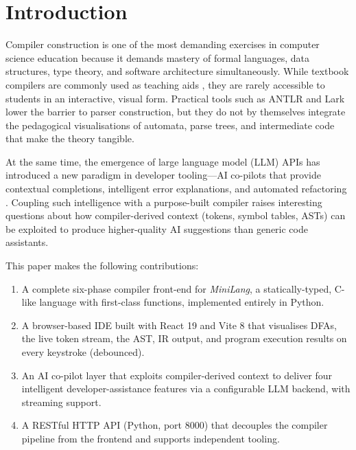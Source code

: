 \documentclass[conference]{IEEEtran}
\begin{document}
\section{Introduction}
\label{sec:intro}

Compiler construction is one of the most demanding exercises in
computer science education because it demands mastery of formal
languages, data structures, type theory, and software architecture
simultaneously. While textbook compilers are commonly used as teaching
aids \cite{dragon_book}, they are rarely accessible to students in an
interactive, visual form. Practical tools such as ANTLR \cite{antlr}
and Lark \cite{lark} lower the barrier to parser construction, but they
do not by themselves integrate the pedagogical visualisations of
automata, parse trees, and intermediate code that make the theory
tangible.

At the same time, the emergence of large language model (LLM) APIs has
introduced a new paradigm in developer tooling---AI co-pilots that
provide contextual completions, intelligent error explanations, and
automated refactoring \cite{copilot}. Coupling such intelligence with a
purpose-built compiler raises interesting questions about how
compiler-derived context (tokens, symbol tables, ASTs) can be exploited
to produce higher-quality AI suggestions than generic code assistants.

This paper makes the following contributions:

\begin{enumerate}
  \item A complete six-phase compiler front-end for \textit{MiniLang},
        a statically-typed, C-like language with first-class functions,
        implemented entirely in Python.
  \item A browser-based IDE built with React 19 and Vite 8 that
        visualises DFAs, the live token stream, the AST, IR output, and
        program execution results on every keystroke (debounced).
  \item An AI co-pilot layer that exploits compiler-derived context to
        deliver four intelligent developer-assistance features via a
        configurable LLM backend, with streaming support.
  \item A RESTful HTTP API (Python, port 8000) that decouples the
        compiler pipeline from the frontend and supports independent
        tooling.
\end{enumerate}
\end{document}
